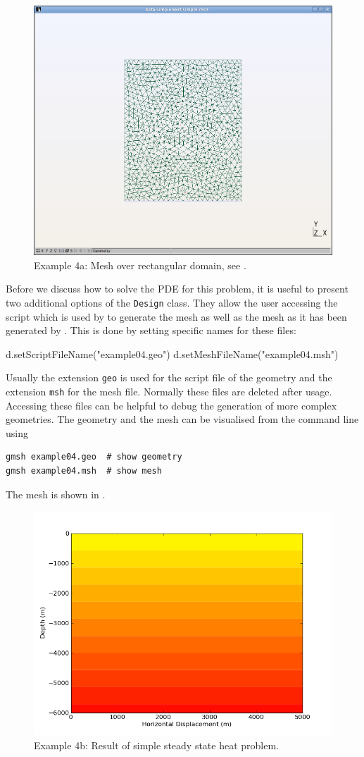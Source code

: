 \begin{figure}[ht]
\centerline{\includegraphics[width=4.in]{figures/simplemesh}}
\caption{Example 4a: Mesh over rectangular domain, see .}
\label{fig:pycad rec mesh}
\end{figure}

Before we discuss how to solve the PDE for this 
problem, it is useful to present two additional options of the \verb|Design|
class. 
They allow the user accessing the script which is used by \gmsh to generate the
mesh as well as
the mesh as it has been generated by \gmsh. This is done by setting specific
names for these files: 
\begin{python}
d.setScriptFileName("example04.geo")
d.setMeshFileName("example04.msh")
\end{python}
Usually the extension \texttt{geo} is used for the script file of the \gmsh
geometry and
the extension \texttt{msh} for the mesh file. Normally these files are deleted
after usage. 
Accessing these files can be helpful to debug the generation of more complex
geometries. The geometry and the mesh can be visualised from the command line
using
\begin{verbatim}
gmsh example04.geo  # show geometry
gmsh example04.msh  # show mesh
\end{verbatim}
The mesh is shown in .
\begin{figure}[ht]
\centerline{\includegraphics[width=4.in]{figures/simpleheat}}
\caption{Example 4b: Result of simple steady state heat problem.}
\label{fig:steady state heat}
\end{figure}


